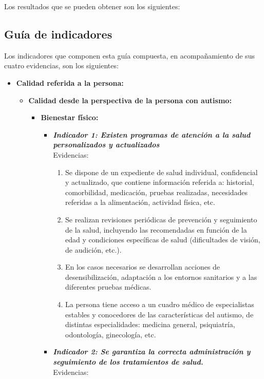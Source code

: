 Los resultados que se pueden obtener son los siguientes:



\subsection{Guía de indicadores}
Los indicadores que componen esta guía compuesta, en acompañamiento de sus cuatro evidencias, son los siguientes:
\begin{itemize}
	\item \textbf{Calidad referida a la persona:}
	\begin{itemize}
		\item \textbf{Calidad desde la perspectiva de la persona con autismo:}
		\begin{itemize}
			\item \textbf{Bienestar físico:}
			\begin{itemize}
				\item \textbf{\textit{Indicador 1: Existen programas de atención a la salud personalizados y actualizados}}\\Evidencias:
				\begin{enumerate}
					\item Se dispone de un expediente de salud individual, confidencial y actualizado, que contiene información referida a: historial, comorbilidad, medicación, pruebas realizadas, necesidades referidas a la alimentación, actividad física, etc.      
					\item Se realizan revisiones periódicas de prevención y seguimiento de la salud, incluyendo las recomendadas en función de la edad y condiciones específicas de salud (dificultades de visión, de audición, etc.).             
					\item En los casos necesarios se desarrollan acciones de desensibilización, adaptación a los entornos sanitarios y a las diferentes pruebas médicas.      
					\item La persona tiene acceso a un cuadro médico de especialistas estables y conocedores de las características del autismo, de distintas especialidades: medicina general, psiquiatría, odontología, ginecología, etc.
				\end{enumerate}
				\item \textbf{\textit{Indicador 2: Se garantiza la correcta administración y seguimiento de los tratamientos de salud.}}\\Evidencias:

\end{itemize}
\end{itemize}
\end{itemize}
\end{itemize}
